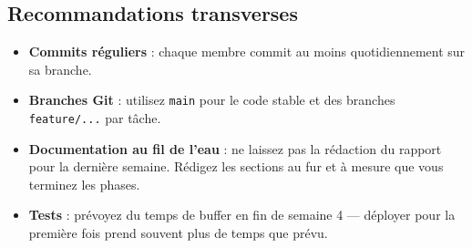 \documentclass[11pt,a4paper]{article}
\providecommand{\tightlist}{\setlength{\itemsep}{0pt}\setlength{\parskip}{0pt}}
\begin{document}
\subsection{Recommandations
transverses}\label{recommandations-transverses}

\begin{itemize}
\tightlist
\item
  \textbf{Commits réguliers} : chaque membre commit au moins
  quotidiennement sur sa branche.
\item
  \textbf{Branches Git} : utilisez \texttt{main} pour le code stable et
  des branches \texttt{feature/...} par tâche.
\item
  \textbf{Documentation au fil de l'eau} : ne laissez pas la rédaction
  du rapport pour la dernière semaine. Rédigez les sections au fur et à
  mesure que vous terminez les phases.
\item
  \textbf{Tests} : prévoyez du temps de buffer en fin de semaine 4 ---
  déployer pour la première fois prend souvent plus de temps que prévu.
\end{itemize}
\end{document}
